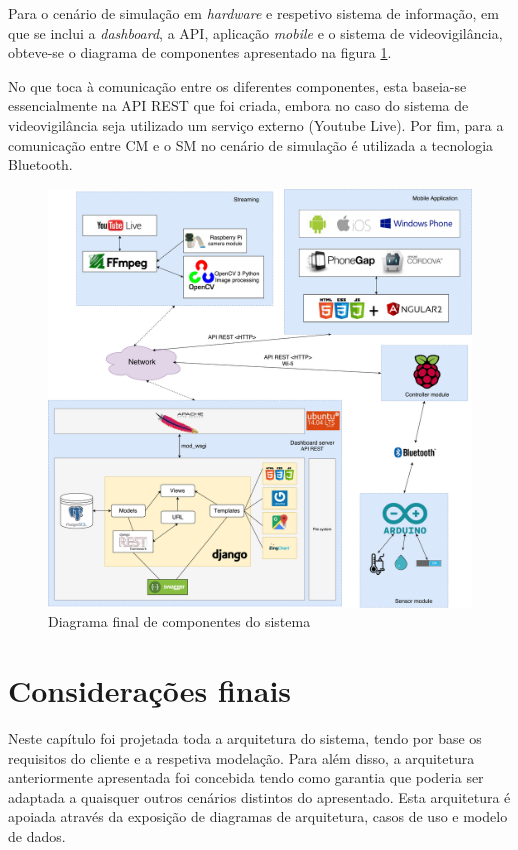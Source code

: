 Para o cenário de simulação em \textit{hardware} e respetivo sistema de informação, em que se inclui a \textit{dashboard}, a \ac{API}, aplicação \textit{mobile} e o sistema de videovigilância, obteve-se o diagrama de componentes apresentado na figura \ref{componentesall}. 

No que toca à comunicação entre os diferentes componentes, esta baseia-se essencialmente na API REST que foi criada, embora no caso do sistema de videovigilância seja utilizado um serviço externo (Youtube Live). Por fim, para a comunicação entre \acl{CM} e o \acl{SM} no cenário de simulação é utilizada a tecnologia Bluetooth. 



\newpage

\begin{figure}[!htb]
	\centering
	\includegraphics[width=\linewidth]{esquemas/arquitetura-final.pdf}
	\caption{Diagrama final de componentes do sistema}
	\label{componentesall}
\end{figure}







\section{Considerações finais}


Neste capítulo foi projetada toda a arquitetura do sistema, tendo por base os requisitos do cliente e a respetiva modelação. Para além disso, a arquitetura anteriormente apresentada foi concebida tendo como garantia que poderia ser adaptada a quaisquer outros cenários distintos do apresentado. Esta arquitetura é apoiada através da exposição de diagramas de arquitetura, casos de uso e modelo de dados. 







